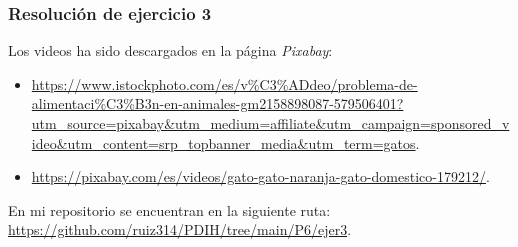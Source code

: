 \newpage
\subsubsection{Resolución de ejercicio 3}\label{subsubsec:ejerc}
Los videos ha sido descargados en la página \textit{Pixabay}: 
\begin{itemize}
    \item \url{https://www.istockphoto.com/es/v%C3%ADdeo/problema-de-alimentaci%C3%B3n-en-animales-gm2158898087-579506401?utm_source=pixabay&utm_medium=affiliate&utm_campaign=sponsored_video&utm_content=srp_topbanner_media&utm_term=gatos}.
    \item \url{https://pixabay.com/es/videos/gato-gato-naranja-gato-domestico-179212/}. 
\end{itemize}

En mi repositorio se encuentran en la siguiente ruta: \url{https://github.com/ruiz314/PDIH/tree/main/P6/ejer3}.

